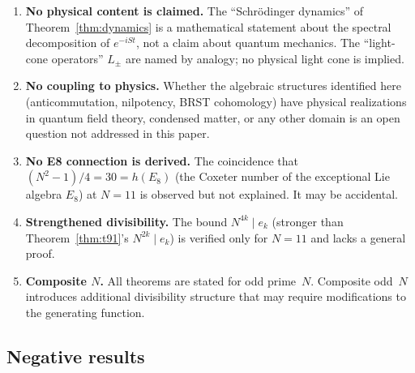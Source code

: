 \documentclass[aip,jmp,reprint,superscriptaddress,floatfix,nofootinbib]{revtex4-2}
\theoremstyle{definition}
\theoremstyle{remark}
\begin{document}
\begin{enumerate}
\item \textbf{No physical content is claimed.}  The
      ``Schr\"odinger dynamics'' of Theorem~\ref{thm:dynamics} is a
      mathematical statement about the spectral decomposition of
      $e^{-iSt}$, not a claim about quantum mechanics.  The
      ``light-cone operators'' $L_\pm$ are named by analogy; no
      physical light cone is implied.

\item \textbf{No coupling to physics.}  Whether the algebraic
      structures identified here (anticommutation, nilpotency, BRST
      cohomology) have physical realizations in quantum field theory,
      condensed matter, or any other domain is an open question not
      addressed in this paper.

\item \textbf{No E8 connection is derived.}  The coincidence that
      $(N^2{-}1)/4 = 30 = h(E_8)$ (the Coxeter number of the
      exceptional Lie algebra $E_8$) at $N{=}11$ is observed but
      not explained.  It may be accidental.

\item \textbf{Strengthened divisibility.}  The bound
      $N^{4k} \mid e_k$ (stronger than Theorem~\ref{thm:t91}'s
      $N^{2k} \mid e_k$) is verified only for $N{=}11$ and lacks a
      general proof.

\item \textbf{Composite $N$.}  All theorems are stated for odd
      prime~$N$.  Composite odd~$N$ introduces additional
      divisibility structure that may require modifications to the
      generating function.
\end{enumerate}

\subsection{Negative results}
\end{document}
